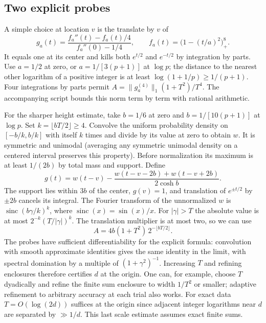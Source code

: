 \subsection*{Two explicit probes}
A simple choice at location $v$ is the translate by $v$ of
\[
 g_a(t)=\frac{f_a''(t)-f_a(t)/4}{f_a''(0)-1/4},
 \qquad f_a(t)=\big(1-(t/a)^2\big)_+^8 .
\]
It equals one at its center and kills both $e^{t/2}$ and $e^{-t/2}$ by
integration by parts. Use $a=1/2$ at zero, or $a=1/[3(p+1)]$ at $\log p$;
the distance to the nearest other logarithm of a positive integer is at least
$\log(1+1/p)\ge1/(p+1)$. Four integrations by parts permit
$A=\|g_a^{(4)}\|_1(1+T^2)/T^4$. The accompanying script bounds this norm
term by term with rational arithmetic.

For the sharper height estimate, take $b=1/6$ at zero and
$b=1/[10(p+1)]$ at $\log p$. Set $k=\lfloor bT/2\rfloor\ge4$.
Convolve the uniform probability density on $[-b/k,b/k]$ with itself $k$
times and divide by its value at zero to obtain $w$. It is symmetric and
unimodal (averaging any symmetric unimodal density on a centered interval
preserves this property). Before normalization its maximum is at least $1/(2b)$
by total mass and support. Define
\[
 g(t)=w(t-v)-\frac{w(t-v-2b)+w(t-v+2b)}{2\cosh b}.
\]
The support lies within $3b$ of the center, $g(v)=1$, and translation of
$e^{\pm t/2}$ by $\pm2b$ cancels its integral. The Fourier transform of the
unnormalized $w$ is $\operatorname{sinc}(b\gamma/k)^k$, where
$\operatorname{sinc}(x)=\sin(x)/x$. For $|\gamma|>T$ the absolute
value is at most $2^{-k}(T/|\gamma|)^k$. The translation multiplier is at
most two, so we can use
\[
 A=4b(1+T^2)\,2^{-\lfloor bT/2\rfloor}.
\]
The probes have sufficient differentiability for the explicit formula:
convolution with smooth approximate identities gives the same identity in
the limit, with spectral domination by a multiple of $(1+\gamma^2)^{-1}$.
Increasing $T$ and refining enclosures therefore certifies $d$ at the
origin. One can, for example, choose $T$ dyadically and refine the finite
sum enclosure to width $1/T^2$ or smaller; adaptive refinement to arbitrary
accuracy at each trial also works. For exact data $T=O(\log(2d))$ suffices at
the origin since adjacent integer logarithms near $d$ are separated by
$\gg1/d$. This last scale estimate assumes exact finite sums.

